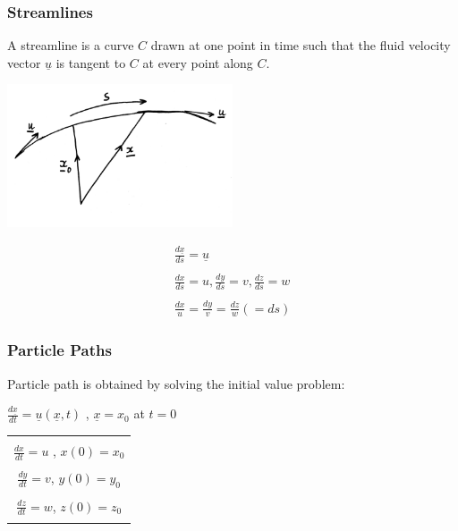 \subsubsection{Streamlines}
A streamline is a curve $C$ drawn at one point in time such that the fluid velocity vector $\underline{u}$ is tangent to $C$ at every point along $C$.
\begin{center}
	\includegraphics[width = 0.5\textwidth]{"Images/Streamline.png"}
\end{center} 
\begin{align*}
	\frac{d\underline{x}}{ds} = \underline{u}
	\\
	\\
	\frac{dx}{ds}=u , \frac{dy}{ds}=v ,  \frac{dz}{ds}=w
	\\
	\\
	\boxed{\frac{dx}{u}=\frac{dy}{v}=\frac{dz}{w}(= ds)}
\end{align*}

\subsubsection{Particle Paths}
Particle path is obtained by solving the initial value problem:
\begin{center}
		$\frac{d\underline{x}}{dt} = \underline{u}(\underline{x},t)$ , $\underline{x} = x_0$ at $t = 0$
		\\
		\begin{tabular}{|c|}
			\hline
			\\
				$\frac{dx}{dt} = u$ , $x(0)=x_0$
			\\ 
			\\
			$\frac{dy}{dt} = v$, $y(0)=y_0$
			\\
			\\
			$\frac{dz}{dt} = w$, $z(0)=z_0$
			\\
			\\
			\hline
		\end{tabular}
\end{center}

	
		


